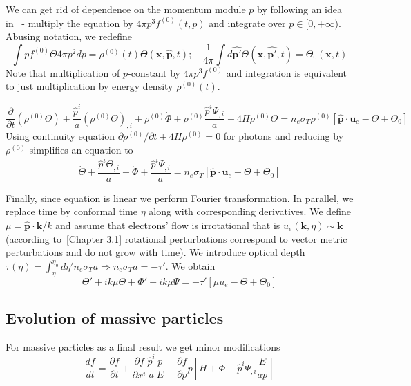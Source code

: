 \documentclass[12pt]{extarticle}
\numberwithin{problem}{section}
\numberwithin{theorem}{section}
\begin{document}
	We can get rid of dependence on the momentum module $p$ by following an idea in~\cite{ma:1995} - multiply the equation by $4\pi p^3 f^{(0)}(t, p)$ and integrate over $p\in[0,+\infty)$. Abusing notation, we redefine 
	\begin{equation}
		\int pf^{(0)} \Theta 4\pi p^2 dp= \rho^{(0)}(t)\Theta(\mathbf{x},\mathbf{\hat{p}}, t);\quad \frac{1}{4\pi}\int d\mathbf{\hat{p'}}\Theta(\mathbf{x}, \mathbf{\hat{p'}}, t) = \Theta_0(\mathbf{x}, t)
	\end{equation}
	Note that multiplication of $p$-constant by $4\pi p^3 f^{(0)}$ and integration is equivalent to just multiplication by energy density $\rho^{(0)}(t)$.

	\begin{equation}
		\frac{\partial}{\partial t}(\rho^{(0)}\Theta) + \frac{\hat{p}^i}{a}(\rho^{(0)}\Theta)_{,i} + \rho^{(0)}\dot{\Phi} + \rho^{(0)}\frac{\hat{p}^i\Psi_{,i}}{a} + 4H\rho^{(0)}\Theta = n_e\sigma_T\rho^{(0)}[\mathbf{\hat{p}}\cdot\mathbf{u}_e - \Theta + \Theta_0]
	\end{equation}
	Using continuity equation $\partial \rho^{(0)}/\partial t + 4H\rho^{(0)} = 0$ for photons and reducing by $\rho^{(0)}$ simplifies an equation to
	\begin{equation}
		\dot{\Theta} + \frac{\hat{p}^i\Theta_{,i}}{a} + \dot{\Phi} + \frac{\hat{p}^i\Psi_{,i}}{a} = n_e\sigma_T[\mathbf{\hat{p}}\cdot\mathbf{u}_e - \Theta + \Theta_0]
	\end{equation}

	Finally, since equation is linear we perform Fourier transformation. In parallel, we replace time by conformal time $\eta$ along with corresponding derivatives. We define $\mu = \mathbf{\hat{p}}\cdot\mathbf{k} / k$ and assume that electrons' flow is irrotational that is $u_e(\mathbf{k}, \eta)\sim\mathbf{k}$ (according to~\cite{gorbunov-rubakov:2011}[Chapter 3.1] rotational perturbations correspond to vector metric perturbations and do not grow with time). We introduce optical depth $\tau(\eta) = \int^{\eta_0}_\eta d\eta' n_e\sigma_Ta \Rightarrow n_e\sigma_Ta = -\tau'$. We obtain
	\begin{equation}
		\Theta' + ik\mu\Theta + \Phi' + ik\mu\Psi = -\tau'[\mu u_e - \Theta + \Theta_0]
	\end{equation}
	
	\subsection{Evolution of massive particles}
	For massive particles as a final result we get minor modifications
	\begin{equation}
		\frac{df}{dt} = \frac{\partial f}{\partial t} + \frac{\partial f}{\partial x^i}\frac{\hat{p}^i}{a}\frac{p}{E} - \frac{\partial f}{\partial p}p\left[H + \dot{\Phi} + \hat{p}^i\Psi_{,i} \frac{E}{ap}\right]
	\end{equation}
	
	
	
\end{document}

